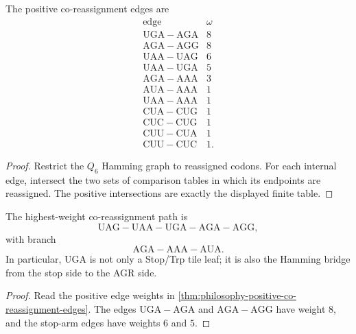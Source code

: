 \begin{theorem}
\label{thm:philosophy-positive-co-reassignment-edges}
The positive co-reassignment edges are
$$
\begin{array}{c|r}
  \text{edge} & \omega\\
\hline
  \mathrm{UGA}{-}\mathrm{AGA} & 8\\
  \mathrm{AGA}{-}\mathrm{AGG} & 8\\
  \mathrm{UAA}{-}\mathrm{UAG} & 6\\
  \mathrm{UAA}{-}\mathrm{UGA} & 5\\
  \mathrm{AGA}{-}\mathrm{AAA} & 3\\
  \mathrm{AUA}{-}\mathrm{AAA} & 1\\
  \mathrm{UAA}{-}\mathrm{AAA} & 1\\
  \mathrm{CUA}{-}\mathrm{CUG} & 1\\
  \mathrm{CUC}{-}\mathrm{CUG} & 1\\
  \mathrm{CUU}{-}\mathrm{CUA} & 1\\
  \mathrm{CUU}{-}\mathrm{CUC} & 1.
\end{array}
$$
\end{theorem}
\begin{proof}
Restrict the $Q_{6}$ Hamming graph to reassigned codons. For each
internal edge, intersect the two sets of comparison tables in which its
endpoints are reassigned. The positive intersections are exactly the
displayed finite table.
\end{proof}

\begin{corollary}
\label{cor:philosophy-weighted-deformation-spine}
The highest-weight co-reassignment path is
$$
  \mathrm{UAG}-\mathrm{UAA}-\mathrm{UGA}-\mathrm{AGA}-\mathrm{AGG},
$$
with branch
$$
  \mathrm{AGA}-\mathrm{AAA}-\mathrm{AUA}.
$$
In particular, $\mathrm{UGA}$ is not only a Stop/Trp tile leaf; it is
also the Hamming bridge from the stop side to the AGR side.
\end{corollary}
\begin{proof}
Read the positive edge weights in
\autoref{thm:philosophy-positive-co-reassignment-edges}. The edges
$\mathrm{UGA}{-}\mathrm{AGA}$ and $\mathrm{AGA}{-}\mathrm{AGG}$ have
weight $8$, and the stop-arm edges have weights $6$ and $5$.
\end{proof}

